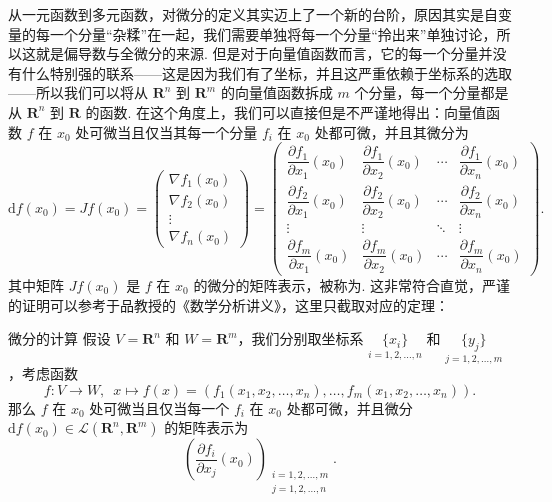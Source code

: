 从一元函数到多元函数，对微分的定义其实迈上了一个新的台阶，原因其实是自变量的每一个分量``杂糅''在一起，我们需要单独将每一个分量``拎出来''单独讨论，所以这就是偏导数与全微分的来源. 但是对于向量值函数而言，它的每一个分量并没有什么特别强的联系——这是因为我们有了坐标，并且这严重依赖于坐标系的选取——所以我们可以将从 $\mathbf{R}^n$ 到 $\mathbf{R}^m$ 的向量值函数拆成 $m$ 个分量，每一个分量都是从 $\mathbf{R}^n$ 到 $\mathbf{R}$ 的函数. 在这个角度上，我们可以直接但是不严谨地得出：向量值函数 $f$ 在 $x_0$ 处可微当且仅当其每一个分量 $f_i$ 在 $x_0$ 处都可微，并且其微分为
\[
    \mathrm{d}f(x_0) = Jf(x_0) =
    \begin{pmatrix} \nabla f_1(x_0) \\ \nabla f_2(x_0) \\ \vdots \\ \nabla f_n(x_0) \end{pmatrix} =
    \begin{pmatrix}
        \dfrac{\partial f_1}{\partial x_1}(x_0) & \dfrac{\partial f_1}{\partial x_2}(x_0) & \cdots & \dfrac{\partial f_1}{\partial x_n}(x_0) \\[2ex]
        \dfrac{\partial f_2}{\partial x_1}(x_0) & \dfrac{\partial f_2}{\partial x_2}(x_0) & \cdots & \dfrac{\partial f_2}{\partial x_n}(x_0) \\[2ex]
        \vdots                                  & \vdots                                  & \ddots & \vdots                                  \\[2ex]
        \dfrac{\partial f_m}{\partial x_1}(x_0) & \dfrac{\partial f_m}{\partial x_2}(x_0) & \cdots & \dfrac{\partial f_m}{\partial x_n}(x_0)
    \end{pmatrix}.
\]
其中矩阵 $Jf(x_0)$ 是 $f$ 在 $x_0$ 的微分的矩阵表示，被称为. 这非常符合直觉，严谨的证明可以参考于品教授的《数学分析讲义》，这里只截取对应的定理：

\begin{theorem}{微分的计算}{}
    假设 $V = \mathbf{R}^n$ 和 $W = \mathbf{R}^m$，我们分别取坐标系 $\underset{i = 1, 2, \ldots, n}{\{x_i\}}$ 和 $\underset{j = 1, 2, \ldots, m}{\{y_j\}}$，考虑函数 \[f\colon V\to W,\enspace x\mapsto f(x) = (f_1(x_1, x_2, \ldots, x_n), \ldots, f_m(x_1, x_2, \ldots, x_n)).\]
    那么 $f$ 在 $x_0$ 处可微当且仅当每一个 $f_i$ 在 $x_0$ 处都可微，并且微分 $\mathrm{d}f(x_0)\in \mathcal{L}(\mathbf{R}^n, \mathbf{R}^m)$ 的矩阵表示为
    \[\left(\frac{\partial f_i}{\partial x_j}(x_0)\right)_{\substack{i = 1, 2, \ldots, m \\ j = 1, 2, \ldots, n}}.\]
\end{theorem}

